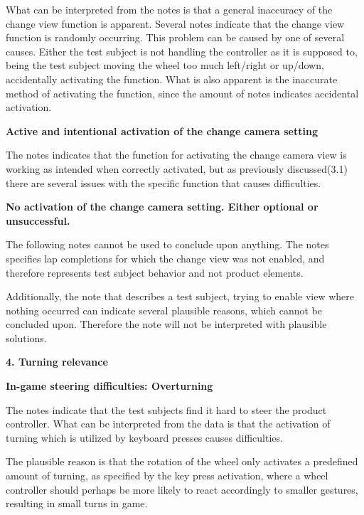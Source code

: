 What can be interpreted from the notes is that a general inaccuracy of the change view function is apparent. 
Several notes indicate that the change view function is randomly occurring. 
This problem can be caused by one of several causes. 
Either the test subject is not handling the controller as it is supposed to, being the test subject moving the wheel too much left/right or up/down, accidentally activating the function. 
What is also apparent is the inaccurate method of activating the function, since the amount of notes indicates accidental activation.
\bigskip

\noindent \textbf{Active and intentional activation of the change camera setting}\newline


The notes indicates that the function for activating the change camera view is working as intended when correctly activated, but as previously discussed({\color{Red}3.1}) there are several issues with the specific function that causes difficulties.
\bigskip

\noindent \textbf{No activation of the change camera setting. Either optional or unsuccessful.}\newline

The following notes cannot be used to conclude upon anything. The notes specifies lap completions for which the change view was not enabled, and therefore represents test subject behavior and not product elements.

Additionally, the note that describes a test subject, trying to enable view where nothing occurred can indicate several plausible reasons, which cannot be concluded upon. 
Therefore the note will not be interpreted with plausible solutions.
\bigskip

\noindent\textbf{4. Turning relevance}\newline
\bigskip

\noindent \textbf{In-game steering difficulties: Overturning}\newline

The notes indicate that the test subjects find it hard to steer the product controller. 
What can be interpreted from the data is that the activation of turning which is utilized by keyboard presses causes difficulties.

The plausible reason is that the rotation of the wheel only activates a predefined amount of turning, as specified by the key press activation, where a wheel controller should perhaps be more likely to react accordingly to smaller gestures, resulting in small turns in game.
\bigskip

